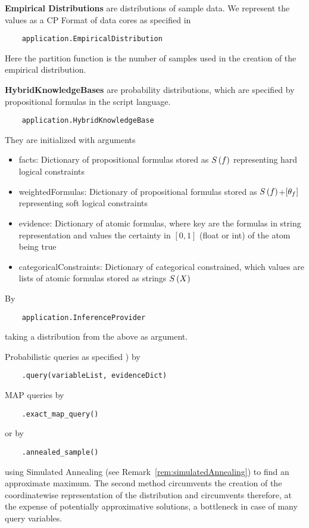 \textbf{Empirical Distributions} are distributions of sample data.
We represent the values as a CP Format of data cores as specified in 
\begin{lstlisting}
	application.EmpiricalDistribution
\end{lstlisting}
Here the partition function is the number of samples used in the creation of the empirical distribution.


\textbf{HybridKnowledgeBases} are probability distributions, which are specified by propositional formulas in the script language.
\begin{lstlisting}
	application.HybridKnowledgeBase
\end{lstlisting}
They are initialized with arguments
\begin{itemize}
    \item facts: Dictionary of propositional formulas stored as $S\left(f\right)$ representing hard logical constraints
    \item weightedFormulas: Dictionary of propositional formulas stored as $S\left(f\right)$+$[\theta_{f}]$ representing soft logical constraints
    \item evidence: Dictionary of atomic formulas, where key are the formulas in string representation and values the certainty in $[0,1]$ (float or int) of the atom being true
    \item categoricalConstraints: Dictionary of categorical constrained, which values are lists of atomic formulas stored as strings $S\left(X\right)$
\end{itemize}



By
\begin{lstlisting}
	application.InferenceProvider
\end{lstlisting}
taking a distribution from the above as argument.

Probabilistic queries as specified )  by
\begin{lstlisting}
	.query(variableList, evidenceDict)
\end{lstlisting}

MAP queries by
\begin{lstlisting}
	.exact_map_query()
\end{lstlisting}
or by
\begin{lstlisting}
	.annealed_sample()
\end{lstlisting}
using Simulated Annealing (see Remark~\ref{rem:simulatedAnnealing}) to find an approximate maximum.
The second method circumvents the creation of the coordinatewise representation of the distribution and circumvents therefore, at the expense of potentially approximative solutions, a bottleneck in case of many query variables.

